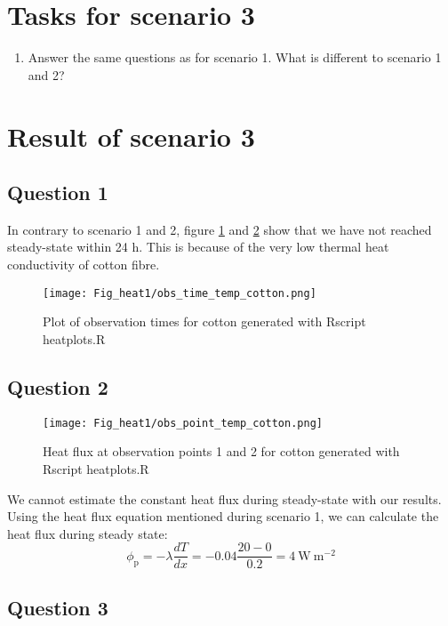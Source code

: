 \section*{Tasks for scenario 3}

\begin{enumerate}
\item Answer the same questions as for scenario 1. What is different to scenario 1 and 2?
\end{enumerate}

\section*{Result of scenario 3}
\subsection*{Question 1}
In contrary to scenario 1 and 2, figure \ref{plot7} and \ref{plot8} show that we have not reached steady-state within 24 h. This is because of the very low thermal heat conductivity of cotton fibre. 

\begin{figure}[!h]
\centering
\texttt{[image: Fig\_heat1/obs\_time\_temp\_cotton.png]}
\caption{\label{plot7}Plot of observation times for cotton generated with Rscript heatplots.R}
\end{figure}

\subsection*{Question 2}

\begin{figure}[!h]
\centering
\texttt{[image: Fig\_heat1/obs\_point\_temp\_cotton.png]}
\caption{\label{plot8} Heat flux at observation points 1 and 2 for cotton generated with Rscript heatplots.R}
\end{figure}

We cannot estimate the constant heat flux during steady-state with our results. Using the heat flux equation mentioned during scenario 1, we can calculate the heat flux during steady state:
\begin{equation*}
\phi_{\mathrm{p}}=-\lambda\frac{dT}{dx}= -0.04 \frac{20-0}{0.2}= 4 \mathrm{~W~m^{-2}}
\end{equation*}

\subsection*{Question 3}

